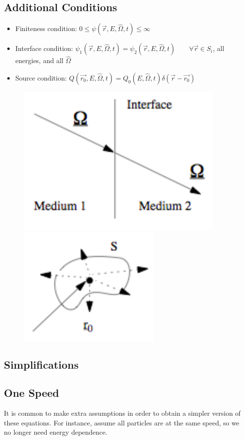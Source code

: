 \documentclass[12pt]{article}
\newcommand{\vOmega}{\ensuremath{\hat{\Omega}}}
\begin{document}
\subsection*{Additional Conditions}
\begin{itemize}
\item Finiteness condition: $0 \leq \psi(\vec{r}, E, \vOmega, t) \leq \infty$
\item Interface condition: $\psi_1(\vec{r}, E, \vOmega, t) = \psi_2(\vec{r}, E, \vOmega, t) \qquad \forall \vec{r} \in S_i$, all energies, and all $\vOmega$
\item Source condition: $Q(\vec{r_0}, E, \vOmega, t) = Q_0(E, \vOmega, t)\delta(\vec{r} - \vec{r_0})$
\end{itemize}

\begin{figure}[h!]
    \begin{center}
    \includegraphics[keepaspectratio, width = 1.5 in]{../figs/interface}
     \includegraphics[keepaspectratio, width = 1.5 in]{../figs/source}
    \end{center}
\end{figure}

\subsection*{Simplifications} 

\subsection*{One Speed}
It is common to make extra assumptions in order to obtain a simpler version of these equations. For instance, assume all particles are at the same speed, so we no longer need energy dependence.

%
\end{document}
